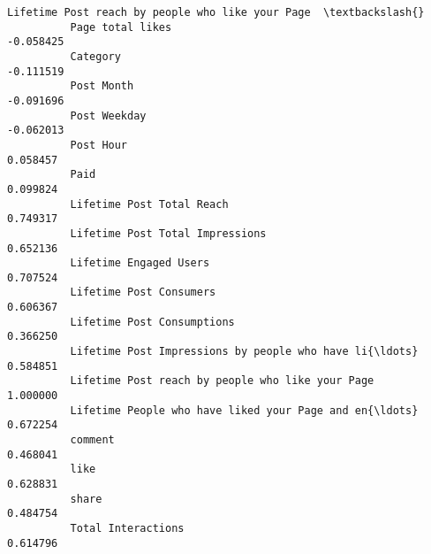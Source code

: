 \documentclass[11pt]{article}
\begin{document}
\begin{Verbatim}[commandchars=\\\{\}]
                                                              Lifetime Post reach by people who like your Page  \textbackslash{}
          Page total likes                                                                           -0.058425   
          Category                                                                                   -0.111519   
          Post Month                                                                                 -0.091696   
          Post Weekday                                                                               -0.062013   
          Post Hour                                                                                   0.058457   
          Paid                                                                                        0.099824   
          Lifetime Post Total Reach                                                                   0.749317   
          Lifetime Post Total Impressions                                                             0.652136   
          Lifetime Engaged Users                                                                      0.707524   
          Lifetime Post Consumers                                                                     0.606367   
          Lifetime Post Consumptions                                                                  0.366250   
          Lifetime Post Impressions by people who have li{\ldots}                                          0.584851   
          Lifetime Post reach by people who like your Page                                            1.000000   
          Lifetime People who have liked your Page and en{\ldots}                                          0.672254   
          comment                                                                                     0.468041   
          like                                                                                        0.628831   
          share                                                                                       0.484754   
          Total Interactions                                                                          0.614796   
          

\end{Verbatim}
\end{document}
